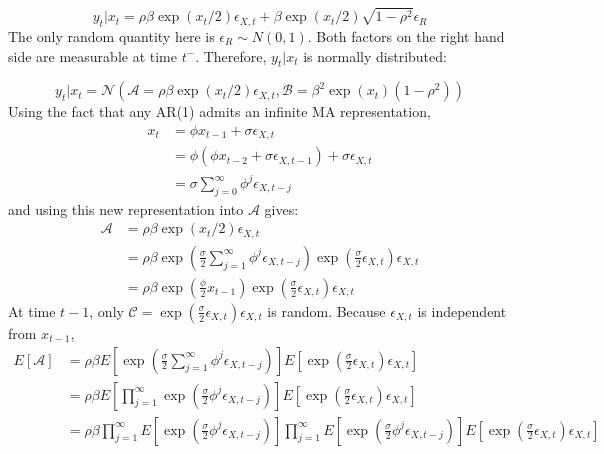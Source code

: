 \documentclass[11pt,a4,twosided,singlespacing,titlepagenumber=on]{scrreprt}
\numberwithin{equation}{chapter} %
\theoremstyle{remark}
\begin{document}
$$y_t | x_t = \rho \beta \exp(x_t / 2) \epsilon_{X,t} + \beta \exp(x_t / 2) \sqrt{1-\rho^2} \epsilon_R$$
The only random quantity here is $\epsilon_R \sim N(0,1)$. Both factors on the right hand side are measurable at time $t^-$. Therefore, $y_t|x_t$ is normally distributed:

$$y_t | x_t = \mathcal{N}\left(\mathcal{A} = \rho \beta \exp(x_t / 2) \epsilon_{X,t}, \mathcal{B} = \beta^2 \exp(x_t) (1-\rho^2)\right)$$
Using the fact that any AR(1) admits an infinite MA representation,
\begin{align*}
x_t &= \phi x_{t-1} + \sigma \epsilon_{X,t} \\ 
	&= \phi(\phi x_{t-2} +\sigma \epsilon_{X,t-1}) + \sigma \epsilon_{X,t} \\
    &= \sigma \sum_{j=0}^\infty \phi^j \epsilon_{X, t-j}
\end{align*}
and using this new representation into $\mathcal{A}$ gives:
\begin{align*}
\mathcal{A} &= \rho \beta \exp(x_t / 2) \epsilon_{X,t} \\
			&= \rho \beta \exp \left( \frac{\sigma}{2} \sum_{j=1}^\infty \phi^j \epsilon_{X, t-j}\right) \exp \left( \frac{\sigma}{2} \epsilon_{X,t} \right) \epsilon_{X,t} \\
			&= \rho \beta \exp \left( \frac{\phi}{2} x_{t-1}\right) \exp \left( \frac{\sigma}{2} \epsilon_{X,t} \right) \epsilon_{X,t}
\end{align*}
At time $t-1$, only $\mathcal{C} = \exp \left( \frac{\sigma}{2} \epsilon_{X,t} \right) \epsilon_{X,t}$ is random. Because $\epsilon_{X,t}$ is independent from $x_{t-1}$,
\begin{align*}
E[\mathcal{A}] &= \rho \beta E\left[\exp \left( \frac{\sigma}{2} \sum_{j=1}^\infty \phi^j \epsilon_{X, t-j}\right)\right] E\left[\exp \left( \frac{\sigma}{2} \epsilon_{X,t} \right) \epsilon_{X,t} \right] \\
			   &= \rho \beta E\left[\prod_{j=1}^\infty \exp \left( \frac{\sigma}{2} \phi^j \epsilon_{X, t-j} \right)  \right] E\left[\exp \left( \frac{\sigma}{2} \epsilon_{X,t} \right) \epsilon_{X,t} \right] \\
			   &= \rho \beta \prod_{j=1}^\infty E\left[\exp \left( \frac{\sigma}{2} \phi^j \epsilon_{X, t-j} \right)  \right]\prod_{j=1}^\infty E\left[\exp \left( \frac{\sigma}{2} \phi^j \epsilon_{X, t-j} \right)  \right] E\left[\exp \left( \frac{\sigma}{2} \epsilon_{X,t} \right) \epsilon_{X,t} \right]
\end{align*}
\end{document}
